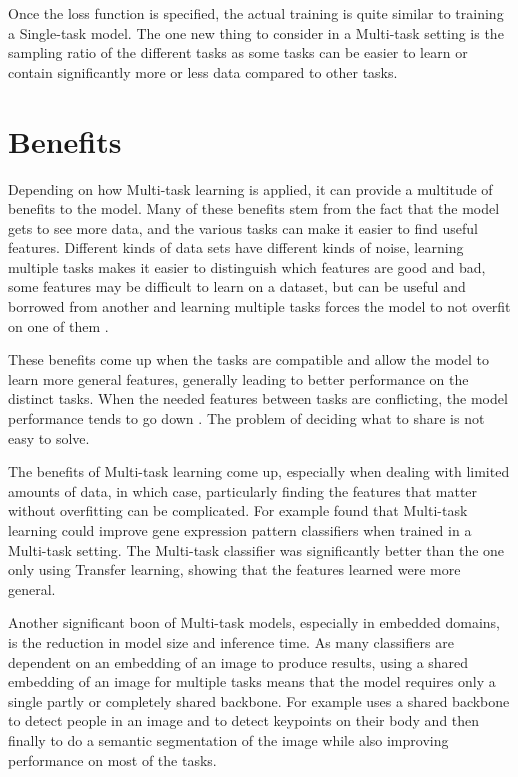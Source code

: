 Once the loss function is specified, the actual training is quite similar to training a Single-task model.
The one new thing to consider in a Multi-task setting is the sampling ratio of the different tasks as some tasks can be easier to learn or contain significantly more or less data compared to other tasks.

\section{Benefits}
Depending on how Multi-task learning is applied, it can provide a multitude of benefits to the model.
Many of these benefits stem from the fact that the model gets to see more data, and the various tasks can make it easier to find useful features.
Different kinds of data sets have different kinds of noise, learning multiple tasks makes it easier to distinguish which features are good and bad, some features may be difficult to learn on a dataset, but can be useful and borrowed from another and learning multiple tasks forces the model to not overfit on one of them \citep{ruderOverview}.

These benefits come up when the tasks are compatible and allow the model to learn more general features, generally leading to better performance on the distinct tasks. 
When the needed features between tasks are conflicting, the model performance tends to go down \citep{uberNet}.
The problem of deciding what to share is not easy to solve.

The benefits of Multi-task learning come up, especially when dealing with limited amounts of data, in which case, particularly finding the features that matter without overfitting can be complicated. 
For example \citep{biologicalMultitask} found that Multi-task learning could improve gene expression pattern classifiers when trained in a Multi-task setting. 
The Multi-task classifier was significantly better than the one only using Transfer learning, showing that the features learned were more general.

Another significant boon of Multi-task models, especially in embedded domains, is the reduction in model size and inference time. 
As many classifiers are dependent on an embedding of an image to produce results, using a shared embedding of an image for multiple tasks means that the model requires only a single partly or completely shared backbone. 
For example \citep{multiPoseNet} uses a shared backbone to detect people in an image and to detect keypoints on their body and then finally to do a semantic segmentation of the image while also improving performance on most of the tasks.

